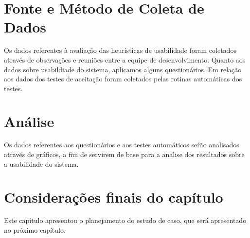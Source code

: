 	

\section{Fonte e Método de Coleta de Dados}

Os dados referentes à avaliação das heurísticas de usabilidade foram coletados através de observações e reuniões entre a equipe de desenvolvimento. Quanto aos dados sobre usabildiade do sistema, aplicamos alguns questionários. Em relação aos dados dos testes de aceitação foram coletados pelas rotinas automáticas dos testes.


\section{Análise}

Os dados referentes aos questionários e aos testes automáticos seŕão analisados através de gráficos, a fim de servirem de base para a analise dos resultados sobre a usabilidade do sistema.

\section{Considerações finais do capítulo}

Este capítulo apresentou o planejamento do estudo de caso, que será apresentado no próximo capítulo.